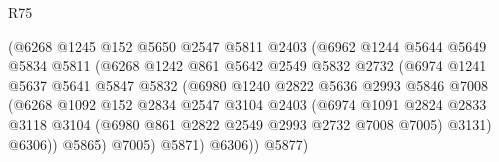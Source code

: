 \begin{lexlean}{R75}
\begin{coremodule}
                                  (@6268
                                    @1245
                                    @152
                                    @5650
                                    @2547
                                    @5811
                                    @2403
                                    (@6962
                                      @1244
                                      @5644
                                      @5649
                                      @5834
                                      @5811
                                      (@6268
                                        @1242
                                        @861
                                        @5642
                                        @2549
                                        @5832
                                        @2732
                                        (@6974
                                          @1241
                                          @5637
                                          @5641
                                          @5847
                                          @5832
                                          (@6980
                                            @1240
                                            @2822
                                            @5636
                                            @2993
                                            @5846
                                            @7008
                                            (@6268
                                              @1092
                                              @152
                                              @2834
                                              @2547
                                              @3104
                                              @2403
                                              (@6974
                                                @1091
                                                @2824
                                                @2833
                                                @3118
                                                @3104
                                                (@6980 @861 @2822 @2549 @2993 @2732 @7008 @7005)
                                                @3131)
                                              @6306))
                                          @5865)
                                        @7005)
                                      @5871)
                                    @6306))
                                @5877)

\end{coremodule}
\end{lexlean}
